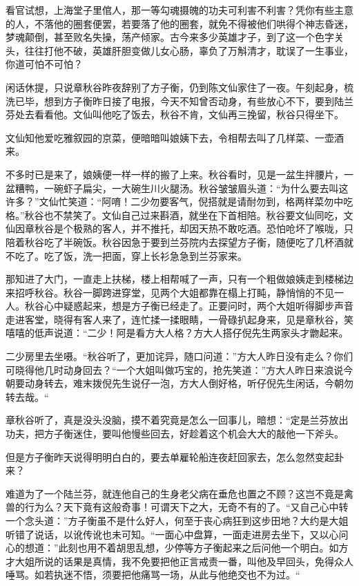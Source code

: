 \documentclass[12pt,UTF8]{ctexbook}
\begin{document}
{{{看官试想，上海堂子里倌人，那一等勾魂摄魄的功夫可利害不利害？凭你有些主意的人，不落他的圈套便罢，若要落了他的圈套，就免不得被他们哄得个神志昏迷，梦魂颠倒，甚至败名失操，荡产倾家。古今来多少英雄才子，到了这一个色字关头，往往打他不破，英雄肝胆变做儿女心肠，辜负了万斛清才，耽误了一生事业，你道可怕不可怕？

闲话休提，只说章秋谷昨夜辞别了方子衡，仍到陈文仙家住了一夜。午刻起身，梳洗已毕，想到方子衡昨日接了电报，今天不知曾否动身，有些放心不下，要到陆兰芬处去看看他。文仙叫他吃了饭去，秋谷不肯，文仙再三挽留，秋谷只得坐下。

文仙知他爱吃雅叙园的京菜，便暗暗叫娘姨下去，令相帮去叫了几样菜、一壶酒来。

不多时已是来了，娘姨便一样一样的搬了上来。秋谷看时，见是一盆生拌腰片，一盆糟鸭，一碗虾子扁尖，一大碗生川火腿汤。秋谷皱皱眉头道：“为什么要去叫这许多？”文仙忙笑道：“阿唷！二少勿要客气，倪搭就是请耐勿到，格两样菜勿中吃格。”秋谷也不禁笑了。文仙自己过来斟酒，就坐在下首相陪。秋谷要文仙同吃，文仙因章秋谷是个极熟的客人，并不推托，却因天热不敢吃酒。恐怕呛坏了喉咙，只陪着秋谷吃了半碗饭。秋谷因急于要到兰芬院内去探望方子衡，随便吃了几杯酒就不吃了。吃了饭，洗一把面，穿上长衫急急到兰芬家来。

那知进了大门，一直走上扶梯，楼上相帮喊了一声，只有一个粗做娘姨走到楼梯边来招呼秋谷。秋谷一脚跨进穿堂，见两个大姐都靠在榻上打盹，静悄悄的不见一人。秋谷心中疑惑起来，想是方子衡已经走了。正要问时，两个大姐听得脚步声音走进客堂，晓得有客人来了，连忙揉一揉眼睛，一骨碌扒起身来，见是章秋谷，笑嘻嘻的低声说道：“二少！阿是看方大人格？方大人搭仔倪先生两家头才朆起来。

二少房里去坐嗫。“秋谷听了，更加诧异，随口问道：”方大人昨日没有走么？你们可晓得他几时动身回去？“一个大姐叫做巧宝的，抢先笑道：”方大人昨日来浪说今朝要动身转去，难末拨倪先生说仔一泡，方大人倒好格，听仔倪先生闲话，今朝勿转去哉。“

章秋谷听了，真是没头没脑，摸不着究竟是怎么一回事儿，暗想：“定是兰芬放出功夫，把方子衡迷住，要叫他慢些回去，好趁着这个机会大大的敲他一下斧头。

但是方子衡昨天说得明明白白的，要去单雇轮船连夜赶回家去，怎么忽然变起卦来？

难道为了一个陆兰芬，就连他自己的生身老父病在垂危也置之不顾？这岂不竟是禽兽的行为么？天下竟有这般奇事！可谓天下之大，无奇不有的了。“又自己心中转一个念头道：”方子衡虽不是什么好人，何至于丧心病狂到这步田地？大约是大姐听错了说话，以讹传讹也未可知。“一面心中盘算，一面走进房去坐下，又以心问心的想道：”此刻也用不着胡思乱想，少停等方子衡起来之后问他一个明白。如方才大姐所说的话果是真情，我不免要把他正言戒责一番，叫他及早回头，免得众人唾骂。如若执迷不悟，须要把他痛骂一场，从此与他绝交也不为过。“

}}}
\end{document}
